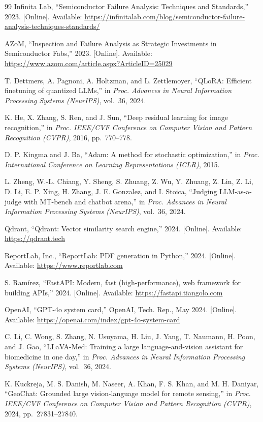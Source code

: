 \documentclass[conference]{IEEEtran}
\begin{document}
\begin{thebibliography}{99}
Infinita Lab, ``Semiconductor Failure Analysis: Techniques and Standards,'' 2023. [Online]. Available: \url{https://infinitalab.com/blog/semiconductor-failure-analysis-techniques-standards/}

AZoM, ``Inspection and Failure Analysis as Strategic Investments in Semiconductor Fabs,'' 2023. [Online]. Available: \url{https://www.azom.com/article.aspx?ArticleID=25029}

T. Dettmers, A. Pagnoni, A. Holtzman, and L. Zettlemoyer, ``QLoRA: Efficient finetuning of quantized LLMs,'' in \textit{Proc. Advances in Neural Information Processing Systems (NeurIPS)}, vol.~36, 2024.

K. He, X. Zhang, S. Ren, and J. Sun, ``Deep residual learning for image recognition,'' in \textit{Proc. IEEE/CVF Conference on Computer Vision and Pattern Recognition (CVPR)}, 2016, pp.~770--778.

D. P. Kingma and J. Ba, ``Adam: A method for stochastic optimization,'' in \textit{Proc. International Conference on Learning Representations (ICLR)}, 2015.

L. Zheng, W.-L. Chiang, Y. Sheng, S. Zhuang, Z. Wu, Y. Zhuang, Z. Lin, Z. Li, D. Li, E. P. Xing, H. Zhang, J. E. Gonzalez, and I. Stoica, ``Judging LLM-as-a-judge with MT-bench and chatbot arena,'' in \textit{Proc. Advances in Neural Information Processing Systems (NeurIPS)}, vol.~36, 2024.

Qdrant, ``Qdrant: Vector similarity search engine,'' 2024. [Online]. Available: \url{https://qdrant.tech}

ReportLab, Inc., ``ReportLab: PDF generation in Python,'' 2024. [Online]. Available: \url{https://www.reportlab.com}

S. Ram\'irez, ``FastAPI: Modern, fast (high-performance), web framework for building APIs,'' 2024. [Online]. Available: \url{https://fastapi.tiangolo.com}

OpenAI, ``GPT-4o system card,'' OpenAI, Tech. Rep., May 2024. [Online]. Available: \url{https://openai.com/index/gpt-4o-system-card}

C. Li, C. Wong, S. Zhang, N. Usuyama, H. Liu, J. Yang, T. Naumann, H. Poon, and J. Gao, ``LLaVA-Med: Training a large language-and-vision assistant for biomedicine in one day,'' in \textit{Proc. Advances in Neural Information Processing Systems (NeurIPS)}, vol.~36, 2024.

K. Kuckreja, M. S. Danish, M. Naseer, A. Khan, F. S. Khan, and M. H. Daniyar, ``GeoChat: Grounded large vision-language model for remote sensing,'' in \textit{Proc. IEEE/CVF Conference on Computer Vision and Pattern Recognition (CVPR)}, 2024, pp.~27831--27840.

\end{thebibliography}
\end{document}
